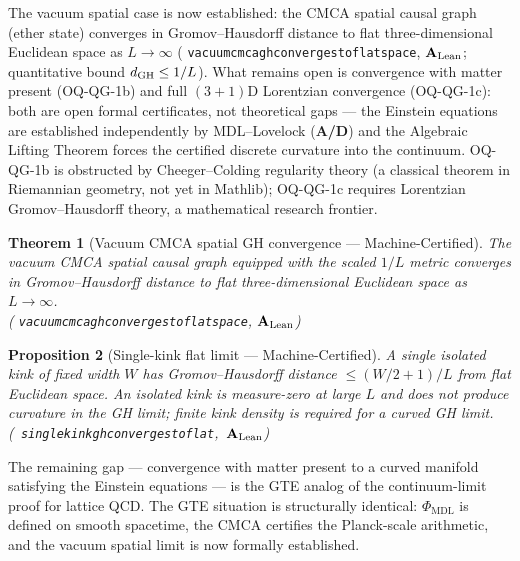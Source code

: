 \documentclass[11pt]{article}
\newtheorem{theorem}{Theorem}[section]
\newtheorem{proposition}[theorem]{Proposition}
\theoremstyle{remark}
\newcommand{\PHIMDL}{\Phi_{\mathrm{MDL}}}
\newcommand{\lean}[1]{%
  \penalty-100
  \begingroup\def\_{\textunderscore\allowbreak}\texttt{#1}\endgroup}
\newcommand{\CatAL}{\ensuremath{\textbf{A}_{\rm Lean}}}
\newcommand{\CatAD}{\textbf{A/D}}
\begin{document}
The vacuum spatial case is now established: the CMCA spatial causal graph (ether state)
converges in Gromov--Hausdorff distance to flat three-dimensional Euclidean space as
$L\to\infty$ (\lean{vacuum\_cmca\_gh\_converges\_to\_flat\_space}, \CatAL; quantitative
bound $d_{\rm GH}\leq 1/L$). What remains open is convergence with matter present
(OQ-QG-1b) and full $(3{+}1)$D Lorentzian convergence (OQ-QG-1c): both are open
formal certificates, not theoretical gaps --- the Einstein equations are established
independently by MDL--Lovelock (\CatAD) and the Algebraic Lifting Theorem forces
the certified discrete curvature into the continuum.  OQ-QG-1b is obstructed by
Cheeger--Colding regularity theory (a classical theorem in Riemannian geometry, not
yet in Mathlib); OQ-QG-1c requires Lorentzian Gromov--Hausdorff theory, a
mathematical research frontier.

\begin{theorem}[Vacuum CMCA spatial GH convergence --- Machine-Certified]
\label{thm:vacuum_cmca_gh_p44}
The vacuum CMCA spatial causal graph equipped with the scaled $1/L$ metric
converges in Gromov--Hausdorff distance to flat three-dimensional Euclidean space
as $L\to\infty$.\\
(\lean{vacuum\_cmca\_gh\_converges\_to\_flat\_space}, \CatAL)
\end{theorem}

\begin{proposition}[Single-kink flat limit --- Machine-Certified]
\label{prop:single_kink_flat_p44}
A single isolated kink of fixed width $W$ has Gromov--Hausdorff distance
$\leq (W/2+1)/L$ from flat Euclidean space. An isolated kink is measure-zero at
large $L$ and does not produce curvature in the GH limit; finite kink density is
required for a curved GH limit.
\mbox{(\lean{single\_kink\_gh\_converges\_to\_flat}, \CatAL)}
\end{proposition}

The remaining gap --- convergence with matter present to a curved manifold satisfying
the Einstein equations --- is the GTE analog of the continuum-limit proof for lattice
QCD.  The GTE situation is structurally identical: $\PHIMDL$ is defined on smooth
spacetime, the CMCA certifies the Planck-scale arithmetic, and the vacuum spatial
limit is now formally established.
\end{document}
